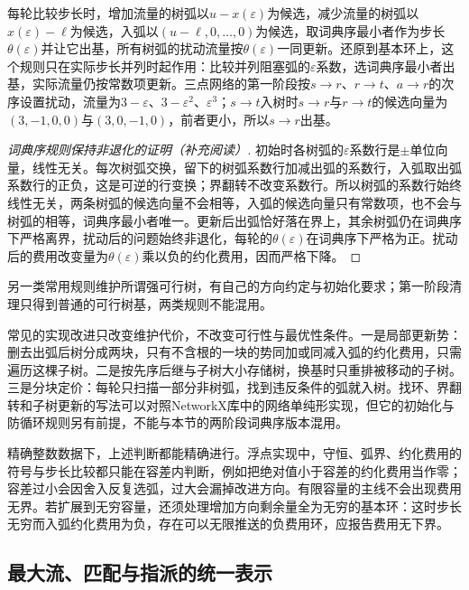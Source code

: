 每轮比较步长时，增加流量的树弧以$u-x(\varepsilon)$为候选，减少流量的树弧以$x(\varepsilon)-\ell$为候选，入弧以$(u-\ell,0,\ldots,0)$为候选，取词典序最小者作为步长$\theta(\varepsilon)$并让它出基，所有树弧的扰动流量按$\theta(\varepsilon)$一同更新。还原到基本环上，这个规则只在实际步长并列时起作用：比较并列阻塞弧的$\varepsilon$系数，选词典序最小者出基，实际流量仍按常数项更新。三点网络的第一阶段按$s\to r$、$r\to t$、$a\to r$的次序设置扰动，流量为$3-\varepsilon$、$3-\varepsilon^2$、$\varepsilon^3$；$s\to t$入树时$s\to r$与$r\to t$的候选向量为$(3,-1,0,0)$与$(3,0,-1,0)$，前者更小，所以$s\to r$出基。

\begin{proof}[词典序规则保持非退化的证明（补充阅读）]
初始时各树弧的$\varepsilon$系数行是$\pm$单位向量，线性无关。每次树弧交换，留下的树弧系数行加减出弧的系数行，入弧取出弧系数行的正负，这是可逆的行变换；界翻转不改变系数行。所以树弧的系数行始终线性无关，两条树弧的候选向量不会相等，入弧的候选向量只有常数项，也不会与树弧的相等，词典序最小者唯一。更新后出弧恰好落在界上，其余树弧仍在词典序下严格离界，扰动后的问题始终非退化，每轮的$\theta(\varepsilon)$在词典序下严格为正。扰动后的费用改变量为$\theta(\varepsilon)$乘以负的约化费用，因而严格下降。
\end{proof}

另一类常用规则维护所谓强可行树，有自己的方向约定与初始化要求；第一阶段清理只得到普通的可行树基，两类规则不能混用。

常见的实现改进只改变维护代价，不改变可行性与最优性条件。一是局部更新势：删去出弧后树分成两块，只有不含根的一块的势同加或同减入弧的约化费用，只需遍历这棵子树。二是按先序后继与子树大小存储树，换基时只重排被移动的子树。三是分块定价：每轮只扫描一部分非树弧，找到违反条件的弧就入树。找环、界翻转和子树更新的写法可以对照NetworkX库中的网络单纯形实现，但它的初始化与防循环规则另有前提，不能与本节的两阶段词典序版本混用。

精确整数数据下，上述判断都能精确进行。浮点实现中，守恒、弧界、约化费用的符号与步长比较都只能在容差内判断，例如把绝对值小于容差的约化费用当作零；容差过小会因舍入反复选弧，过大会漏掉改进方向。有限容量的主线不会出现费用无界。若扩展到无穷容量，还须处理增加方向剩余量全为无穷的基本环：这时步长无穷而入弧约化费用为负，存在可以无限推送的负费用环，应报告费用无下界。

\subsection{最大流、匹配与指派的统一表示}
\label{sec:graph-opt-mcf-unified}

